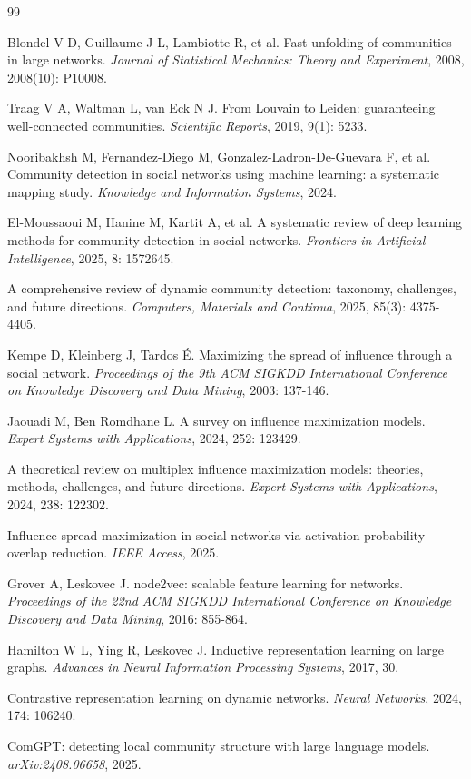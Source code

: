 \documentclass[12pt,a4paper]{article}
\begin{document}
\begin{thebibliography}{99}

 Blondel V D, Guillaume J L, Lambiotte R, et al. Fast unfolding of communities in large networks. \textit{Journal of Statistical Mechanics: Theory and Experiment}, 2008, 2008(10): P10008.

 Traag V A, Waltman L, van Eck N J. From Louvain to Leiden: guaranteeing well-connected communities. \textit{Scientific Reports}, 2019, 9(1): 5233.

 Nooribakhsh M, Fernandez-Diego M, Gonzalez-Ladron-De-Guevara F, et al. Community detection in social networks using machine learning: a systematic mapping study. \textit{Knowledge and Information Systems}, 2024.

 El-Moussaoui M, Hanine M, Kartit A, et al. A systematic review of deep learning methods for community detection in social networks. \textit{Frontiers in Artificial Intelligence}, 2025, 8: 1572645.

 A comprehensive review of dynamic community detection: taxonomy, challenges, and future directions. \textit{Computers, Materials and Continua}, 2025, 85(3): 4375-4405.

 Kempe D, Kleinberg J, Tardos \'E. Maximizing the spread of influence through a social network. \textit{Proceedings of the 9th ACM SIGKDD International Conference on Knowledge Discovery and Data Mining}, 2003: 137-146.

 Jaouadi M, Ben Romdhane L. A survey on influence maximization models. \textit{Expert Systems with Applications}, 2024, 252: 123429.

 A theoretical review on multiplex influence maximization models: theories, methods, challenges, and future directions. \textit{Expert Systems with Applications}, 2024, 238: 122302.

 Influence spread maximization in social networks via activation probability overlap reduction. \textit{IEEE Access}, 2025.

 Grover A, Leskovec J. node2vec: scalable feature learning for networks. \textit{Proceedings of the 22nd ACM SIGKDD International Conference on Knowledge Discovery and Data Mining}, 2016: 855-864.

 Hamilton W L, Ying R, Leskovec J. Inductive representation learning on large graphs. \textit{Advances in Neural Information Processing Systems}, 2017, 30.

 Contrastive representation learning on dynamic networks. \textit{Neural Networks}, 2024, 174: 106240.

 ComGPT: detecting local community structure with large language models. \textit{arXiv:2408.06658}, 2025.

\end{thebibliography}
\end{document}
